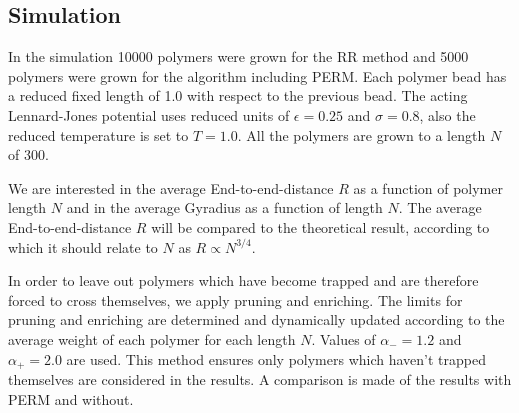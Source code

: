 \subsection*{Simulation}
In the simulation 10000 polymers were grown for the RR method and 5000 polymers were grown for the algorithm including PERM. Each polymer bead has a reduced fixed length of 1.0 with respect to the previous bead. The acting Lennard-Jones potential uses reduced units of $\epsilon=0.25$ and $\sigma=0.8$, also the reduced temperature is set to $T=1.0$. All the polymers are grown to a length $N$ of 300. 

We are interested in the average End-to-end-distance $R$ as a function of polymer length $N$ and in the average Gyradius as a function of length $N$. The average End-to-end-distance $R$ will be compared to the theoretical result, according to which it should relate to $N$ as $R\propto N^{3/4}$.

In order to leave out polymers which have become trapped and are therefore forced to cross themselves, we apply pruning and enriching. The limits for pruning and enriching are determined and dynamically updated according to the average weight of each polymer for each length $N$. Values of $\alpha_-=1.2$ and $\alpha_+=2.0$ are used. This method ensures only polymers which haven't trapped themselves are considered in the results. A comparison is made of the results with PERM and without.